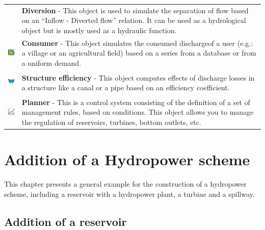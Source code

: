 \documentclass[
  letterpaper,
  DIV=11,
  numbers=noendperiod]{scrreprt}
\begin{document}
\begin{longtable}[]{@{}
  >{\raggedright\arraybackslash}p{}
  >{\raggedright\arraybackslash}p{}@{}}
& \textbf{Diversion} - This object is used to simulate the separation of
flow based on an ``Inflow - Diverted flow'' relation. It can be used as
a hydrological object but is mostly used as a hydraulic function. \\
\includegraphics[width=0.44in,height=0.44in]{./figures/fig-icon_object_consumer.png}
& \textbf{Consumer} - This object simulates the consumed dischargeof a
user (e.g.: a village or an agricultural field) based on a series from a
database or from a uniform demand. \\
\includegraphics[width=0.44in,height=0.44in]{./figures/fig-icon_object_efficiency.png}
& \textbf{Structure efficiency} - This object computes effects of
discharge losses in a structure like a canal or a pipe based on an
efficiency coefficient. \\
\includegraphics[width=0.44in,height=0.44in]{./figures/fig-icon_object_planner.png}
& \textbf{Planner} - This is a control system consisting of the
definition of a set of management rules, based on conditions. This
object allows you to manage the regulation of reservoirs, turbines,
bottom outlets, etc. \\
\bottomrule()
\end{longtable}

\hypertarget{sec-user_hydraulic_infrastructures_hydropower}{%
\chapter{Addition of a Hydropower
scheme}\label{sec-user_hydraulic_infrastructures_hydropower}}

This chapter presents a general example for the construction of a
hydropower scheme, including a reservoir with a hydropower plant, a
turbine and a spillway.

\hypertarget{addition-of-a-reservoir}{%
\section{Addition of a reservoir}\label{addition-of-a-reservoir}}
\end{document}
